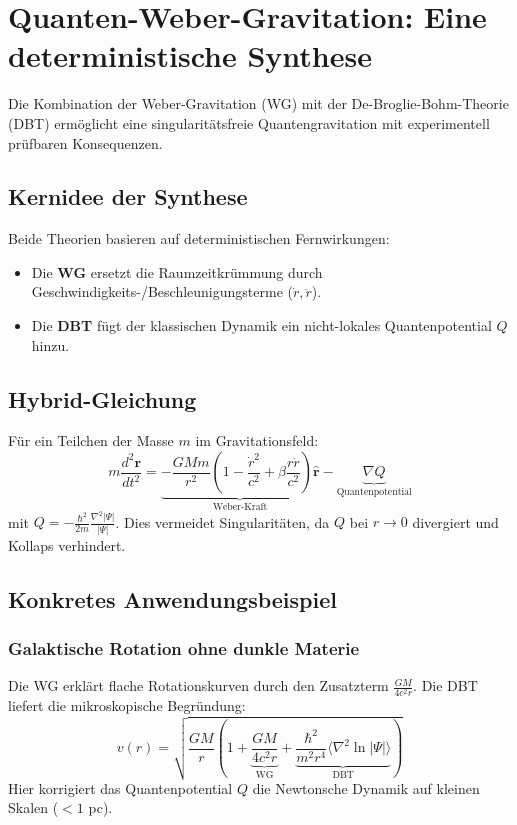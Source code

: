 \section{Quanten-Weber-Gravitation: Eine deterministische Synthese}
Die Kombination der Weber-Gravitation (WG) mit der De-Broglie-Bohm-Theorie (DBT) ermöglicht eine singularitätsfreie Quantengravitation mit experimentell prüfbaren Konsequenzen.

\subsection{Kernidee der Synthese}
Beide Theorien basieren auf deterministischen Fernwirkungen:
\begin{itemize}
    \item Die \textbf{WG} ersetzt die Raumzeitkrümmung durch Geschwindigkeits-/Beschleunigungsterme ($\dot{r}, \ddot{r}$).
    \item Die \textbf{DBT} fügt der klassischen Dynamik ein nicht-lokales Quantenpotential $Q$ hinzu.
\end{itemize}

\subsection{Hybrid-Gleichung}
Für ein Teilchen der Masse $m$ im Gravitationsfeld:
\begin{equation}
    m\frac{d^2\mathbf{r}}{dt^2} = \underbrace{-\frac{GMm}{r^2}\left(1-\frac{\dot{r}^2}{c^2}+\beta\frac{r\ddot{r}}{c^2}\right)\hat{\mathbf{r}}}_{\text{Weber-Kraft}} - \underbrace{\nabla Q}_{\text{Quantenpotential}}
\end{equation}
mit $Q = -\frac{\hbar^2}{2m}\frac{\nabla^2|\Psi|}{|\Psi|}$. Dies vermeidet Singularitäten, da $Q$ bei $r \to 0$ divergiert und Kollaps verhindert.

\subsection{Konkretes Anwendungsbeispiel}
\subsubsection{Galaktische Rotation ohne dunkle Materie}
Die WG erklärt flache Rotationskurven durch den Zusatzterm $\frac{GM}{4c^2r}$. Die DBT liefert die mikroskopische Begründung:
\begin{equation}
    v(r) = \sqrt{\frac{GM}{r}\left(1 + \underbrace{\frac{GM}{4c^2r}}_{\text{WG}} + \underbrace{\frac{\hbar^2}{m^2r^4}\langle \nabla^2 \ln|\Psi| \rangle}_{\text{DBT}}\right)}
\end{equation}
Hier korrigiert das Quantenpotential $Q$ die Newtonsche Dynamik auf kleinen Skalen ($<1$ pc).

